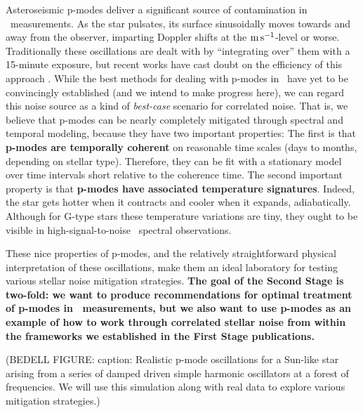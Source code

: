 \documentclass[12pt, letterpaper]{article}
\begin{document}
Asteroseismic p-modes deliver a significant source of contamination in \EPRV\
measurements. 
As the star pulsates, its surface sinusoidally moves towards and away from
the observer, imparting Doppler shifts at the ${\mathrm{m\,s^{-1}}}$-level or worse.
Traditionally these oscillations are dealt with by ``integrating over'' them
with a 15-minute exposure, but recent works have cast doubt on the efficiency 
of this approach \citep{Medina2018, Chaplin2019}. 
While the best methods for dealing with p-modes in \EPRV\ have yet 
to be convincingly established (and we intend to make progress here),
we can regard this noise source as a kind of
\textit{best-case} scenario for correlated noise. That is, we believe that 
p-modes can be nearly completely mitigated through spectral and temporal modeling, 
because they have two important properties:
The first is that
\textbf{p-modes are temporally coherent} on reasonable time scales (days to months, depending on
stellar type). Therefore, they can be fit with a stationary model over time intervals 
short relative to the coherence time. 
The second important property is that
\textbf{p-modes have associated temperature signatures}. Indeed, the star gets
hotter when it contracts and cooler when it expands, adiabatically. Although for
G-type stars these temperature variations are tiny, they ought to be visible in
high-signal-to-noise \EPRV\ spectral observations.

These nice properties of p-modes, and the relatively straightforward physical 
interpretation of these oscillations, make them an ideal laboratory for testing
various stellar noise mitigation strategies. \textbf{The goal of the Second Stage is 
two-fold: we want to produce recommendations for optimal treatment of p-modes
in \EPRV\ measurements, but we also want to use p-modes as an 
example of how to work through correlated stellar noise from within the 
frameworks we established in the First Stage publications.}

(BEDELL FIGURE:
caption: Realistic p-mode oscillations for a Sun-like star arising 
from a series of damped driven simple harmonic oscillators at 
a forest of frequencies. We will use this simulation along with
real data to explore various mitigation strategies.)
\end{document}
